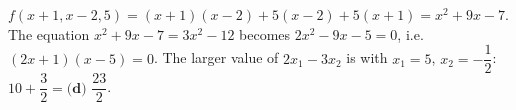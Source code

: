 $f(x+1,x-2,5)=(x+1)(x-2)+5(x-2)+5(x+1)=x^2+9x-7$. The equation $x^2+9x-7=3x^2-12$ becomes $2x^2-9x-5=0$, i.e. $(2x+1)(x-5)=0$. The larger value of $2x_1-3x_2$ is with $x_1=5$, $x_2=-\dfrac12$: $10+\dfrac32=\boxed{\textbf{(d) }\dfrac{23}2}$.
